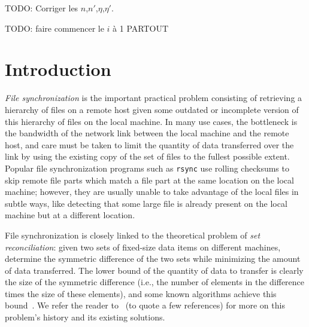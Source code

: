 \documentclass[11pt]{llncs}
\newcommand{\rsync}{\texttt{rsync}\xspace}
\begin{document}
TODO: Corriger les $n$,$n'$,$\eta$,$\eta'$.

TODO: faire commencer le $i$ à 1  PARTOUT

\section{Introduction}

\emph{File synchronization} is the important practical problem consisting of
retrieving a hierarchy of files on a remote host given some outdated or
incomplete version of this hierarchy of files on the local machine. In many use
cases, the bottleneck is the bandwidth of the network link between the local machine
and the remote host, and care must be taken to limit the quantity of data
transferred over the link by using the existing copy of the set of files to the
fullest possible extent. Popular file synchronization programs such as \rsync
use rolling checksums to skip remote file parts which match a file part at the
same location on the local machine; however, they are usually unable to take
advantage of the local files in subtle ways, like detecting that some large file
is already present on the local machine but at a different location.

File synchronization is closely linked to the theoretical problem of \emph{set
reconciliation}: given two sets of fixed-size data items on different machines,
determine the symmetric difference of the two sets while minimizing the amount
of data transferred. The lower bound of the quantity of data to transfer is
clearly the size of the symmetric difference (i.e., the number of elements in the
difference times the size of these elements), and some known algorithms achieve
this bound~\cite{PSRec}. We refer the reader to~\cite{PSRec,Mins1,Whats} (to
quote a few references) for more on this problem's history and its existing
solutions.
\end{document}
